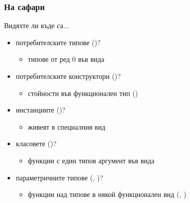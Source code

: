 \documentclass[alsotrans]{beamerswitch}
\begin{document}
\begin{frame}
  \frametitle{На сафари}
  \small
  Видяхте ли къде са...
  \begin{itemize}[<+->]
  \item потребителските типове ()?
    \begin{itemize}
    \item типове от ред 0 във вида \lst{*}
    \end{itemize}
  \item потребителските конструктори ()?
    \begin{itemize}
    \item стойности във функционален тип ()
    \end{itemize}
  \item инстанциите ()?
    \begin{itemize}
    \item живеят в специалния вид 
    \end{itemize}
  \item класовете ()?
    \begin{itemize}
    \item функции с един типов аргумент във вида 
    \end{itemize}
  \item параметричните типове (, )?
    \begin{itemize}
    \item функции над типове в някой функционален вид (\lst{* -> *}, \lst{* -> * -> *})
    \end{itemize}
  \end{itemize}
\end{frame}
\end{document}
